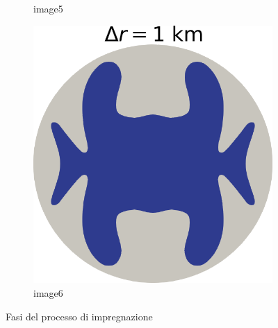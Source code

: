 \documentclass{article}
\begin{document}
\begin{figure}[!h]
\begin{subfigure}{0.25\textwidth}
		\caption{image5}
		\label{fig:5}
	\end{subfigure}\hfil %
	\begin{subfigure}{0.25\textwidth}
		\includegraphics[width=\linewidth]{../fig/Grounded_zone_1km.png}
		\caption{image6}
		\label{fig:6}
	\end{subfigure}
	\caption{Fasi del processo di impregnazione}
	\label{fig:images}
\end{figure}
\end{document}

